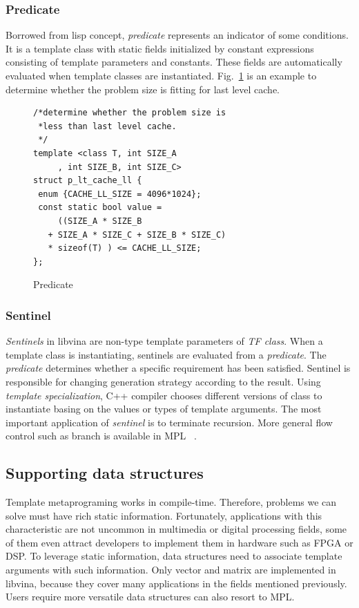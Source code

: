 \documentclass[10pt, conference, compsocconf]{IEEEtran}
\begin{document}
\subsubsection{Predicate}
Borrowed from lisp concept, \emph{predicate} represents an indicator
of some conditions. It is a template class with static
fields initialized by constant expressions consisting of template
parameters and constants. These fields are automatically evaluated
when template classes are instantiated. Fig.~\ref{lst:pred} is an example to determine whether the problem size is fitting for last level cache.

\begin{figure}[!htp]
\begin{minipage}[tb]{\linewidth}
\makebox[\textwidth]{\hrulefill}
\begin{small}
\begin{verbatim}
/*determine whether the problem size is 
 *less than last level cache.
 */
template <class T, int SIZE_A
     , int SIZE_B, int SIZE_C>
struct p_lt_cache_ll {
 enum {CACHE_LL_SIZE = 4096*1024};
 const static bool value = 
     ((SIZE_A * SIZE_B 
   + SIZE_A * SIZE_C + SIZE_B * SIZE_C) 
   * sizeof(T) ) <= CACHE_LL_SIZE;
};
\end{verbatim}
\end{small}
\vspace{-1ex}\makebox[\textwidth]{\hrulefill}
\end{minipage}
\caption{Predicate}\label{lst:pred}
\end{figure}

\subsubsection{Sentinel}
\emph{Sentinels} in libvina are non-type template parameters of
\emph{TF class}. When a template class is instantiating, sentinels are
evaluated from a \emph{predicate}.  The \emph{predicate} determines
whether a specific requirement has been satisfied. Sentinel is
responsible for changing generation strategy according to the
result. Using \emph{template specialization}, C++ compiler chooses
different versions of class to instantiate basing on the values or
types of template arguments. The most important application of
\emph{sentinel} is to  terminate recursion. More general flow control
such as branch is available in MPL ~\cite{mpl}.

\subsection{Supporting data structures}
Template metaprograming works in compile-time. Therefore, problems we can solve must have rich static
information. Fortunately,  applications with this characteristic are
not uncommon in multimedia or digital processing fields, some of them 
even attract developers to implement them in hardware such as FPGA or DSP. To leverage
static information, data structures need to associate template
arguments with such information. Only vector and matrix are implemented in libvina,
because they cover many applications in the fields mentioned
previously. Users require more versatile data structures can also
resort to MPL.
\end{document}
